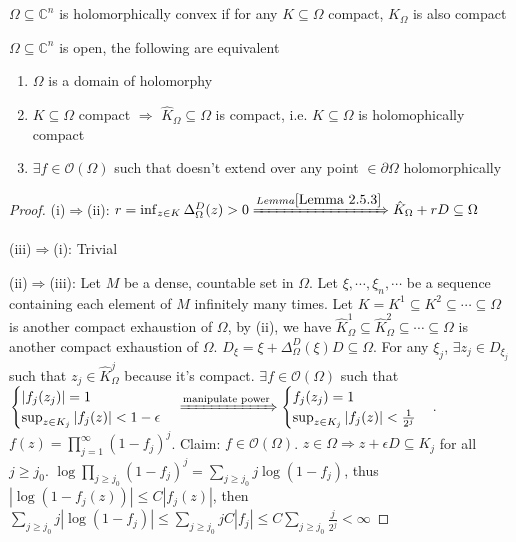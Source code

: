 \documentclass[../main.tex]{subfiles}
\begin{document}
\begin{definition}
$\Omega\subseteq\mathbb C^n$ is holomorphically convex if for any $K\subseteq\Omega$ compact, $\hat K_\Omega$ is also compact
\end{definition}

\begin{theorem}
$\Omega\subseteq\mathbb C^n$ is open, the following are equivalent
\begin{enumerate}[label=(\roman*)]
\item $\Omega$ is a domain of holomorphy
\item $K\subseteq\Omega$ compact $\Rightarrow$ $\hat K_\Omega\subseteq\Omega$ is compact, i.e. $K\subseteq\Omega$ is holomophically compact
\item $\exists f\in\mathcal O(\Omega)$ such that doesn't extend over any point $\in\partial\Omega$ holomorphically
\end{enumerate}
\end{theorem}

\begin{proof}
(i)$\Rightarrow$(ii): $r=\inf_{z\in K}\Delta^D_\Omega(z)>0\xRightarrow{Lemma \ref{Lemma 2.5.3}}\hat K_\Omega+rD\subseteq \Omega$ \par
(iii)$\Rightarrow$(i): Trivial \par
(ii)$\Rightarrow$(iii): Let $M$ be a dense, countable set in $\Omega$. Let $\xi,\cdots,\xi_n,\cdots$ be a sequence containing each element of $M$ infinitely many times. Let $K=K^1\subseteq K^2\subseteq\cdots\subseteq\Omega$ is another compact exhaustion of $\Omega$, by (ii), we have $\hat K^1_\Omega\subseteq\hat K^2_\Omega\subseteq\cdots\subseteq\Omega$ is another compact exhaustion of $\Omega$. $D_\xi=\xi+\Delta^D_\Omega(\xi)D\subseteq\Omega$. For any $\xi_j$, $\exists z_j\in D_{\xi_j}$ such that $z_j\in\hat K^j_\Omega$ because it's compact. $\exists f\in\mathcal O(\Omega)$ such that $\begin{cases}
|f_j(z_j)|=1 \\
\sup_{z\in K_j}|f_j(z)|<1-\epsilon
\end{cases}\xRightarrow{\text{manipulate power}}\begin{cases}
f_j(z_j)=1 \\
\sup_{z\in K_j}|f_j(z)|<\frac{1}{2^j}
\end{cases}$. $f(z)=\prod_{j=1}^\infty(1-f_j)^j$. Claim: $f\in\mathcal O(\Omega)$. $z\in\Omega\Rightarrow z+\epsilon D\subseteq K_j$ for all $j\geq j_0$. $\log\prod_{j\geq j_0}(1-f_j)^j=\sum_{j\geq j_0}j\log(1-f_j)$, thus $|\log(1-f_j(z))|\leq C|f_j(z)|$, then $\sum_{j\geq j_0}j|\log(1-f_j)|\leq\sum_{j\geq j_0}jC|f_j|\leq C\sum_{j\geq j_0}\frac{j}{2^j}<\infty$
\end{proof}
\end{document}
